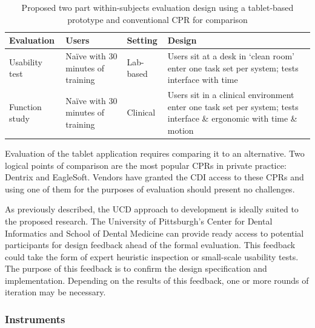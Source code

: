 \documentclass[11pt]{article}
\newcommand{\ra}[1]{\renewcommand{\arraystretch}{#1}}
\begin{document}
\begin{table}[h!b]
\label{evaldesign}
\caption{Proposed two part within-subjects evaluation design using a tablet-based prototype and conventional CPR for comparison}
	\begin{center}
	\ra{1.3}
\begin{tabular*}{\textwidth}{p{1.9cm}p{2cm}p{1.9cm}p{5.1cm}}  
\toprule
\textbf{Evaluation} & \textbf{Users} & \textbf{Setting} & \textbf{Design} \\
\midrule
Usability test & Na\"{i}ve with 30 minutes of training & Lab-based & Users sit at a desk in `clean room' enter one task set per system; tests interface with time \vspace{4pt}\\ 

Function study & Na\"{i}ve with 30 minutes of training & Clinical & Users sit in a clinical environment enter one task set per system; tests interface \& ergonomic with time \& motion \\
\bottomrule
\end{tabular*} \end{center}\end{table}

Evaluation of the tablet application requires comparing it to an alternative. Two logical points of comparison are the most popular CPRs in private practice: Dentrix and EagleSoft. Vendors have granted the CDI access to these CPRs and using one of them for the purposes of evaluation should present no challenges.

As previously described, the UCD approach to development is ideally suited to the proposed research. The University of Pittsburgh's Center for Dental Informatics and School of Dental Medicine can provide ready access to potential participants for design feedback ahead of the formal evaluation. This feedback could take the form of expert heuristic inspection or small-scale usability tests. The purpose of this feedback is to confirm the design specification and implementation. Depending on the results of this feedback, one or more rounds of iteration may be necessary.

\subsubsection{Instruments}
\end{document}
